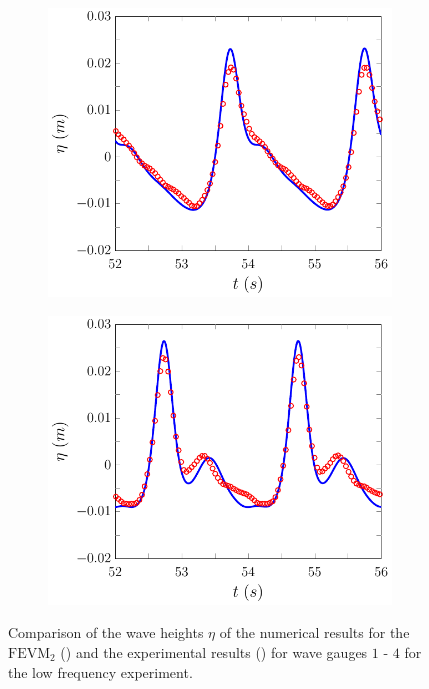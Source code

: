 \begin{figure}
\begin{subfigure}{0.5\textwidth}
		\vspace{0.5cm}
	\end{subfigure}
	\begin{subfigure}{0.5\textwidth}
		\includegraphics[width=\textwidth]{./chp6/figures/Experiment/Beji/sl/FEVMWG3.pdf}
		\vspace{0.5cm}
	\end{subfigure}%
	\begin{subfigure}{0.5\textwidth}
		\includegraphics[width=\textwidth]{./chp6/figures/Experiment/Beji/sl/FEVMWG4.pdf}
		\vspace{0.5cm}
	\end{subfigure}
	\caption{Comparison of the wave heights $\eta$ of the numerical results for the $\text{FEVM}_2$ ({\color{blue}\solidrule}) and the experimental results () for wave gauges $1$ - $4$ for the low frequency experiment.}
	\label{fig:BejislWG1to4FEVM}
\end{figure}

